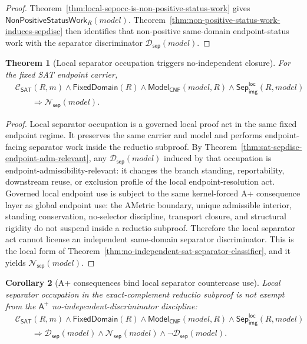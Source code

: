 \documentclass[11pt]{article}
\newtheorem{theorem}{Theorem}[section]
\newtheorem{corollary}[theorem]{Corollary}
\theoremstyle{definition}
\theoremstyle{remark}
\newcommand{\LocalSepImgOcc}{\mathsf{Sep}_{\mathsf{img}}^{\mathsf{loc}}}
\newcommand{\Aplus}{\mathsf{A}^{+}}
\newcommand{\ClayCtx}{\mathcal{C}_{\mathsf{SAT}}(R,m)}
\newcommand{\FixedDom}{\mathsf{FixedDomain}}
\newcommand{\SepDisc}{\mathcal{D}_{\mathsf{sep}}}
\newcommand{\NoSepDisc}{\mathcal{N}_{\mathsf{sep}}}
\newcommand{\ModelOfCnf}{\mathsf{Model}_{\mathsf{CNF}}}
\newcommand{\NonPositiveStatusWork}{\mathsf{NonPositiveStatusWork}}
\begin{document}
\begin{proof}
Theorem~\ref{thm:local-sepocc-is-non-positive-status-work} gives \(\NonPositiveStatusWork_R(model)\). Theorem~\ref{thm:non-positive-status-work-induces-sepdisc} then identifies that non-positive same-domain endpoint-status work with the separator discriminator \(\SepDisc(model)\).
\end{proof}

\begin{theorem}[Local separator occupation triggers no-independent closure]
\label{thm:local-sepocc-triggers-noindependent}
For the fixed SAT endpoint carrier,
\[
\begin{aligned}
  &\ClayCtx\wedge\FixedDom(R)\wedge\ModelOfCnf(model,R)\wedge\LocalSepImgOcc(R,model)\\
  &\qquad\Rightarrow \NoSepDisc(model).
\end{aligned}
\]
\end{theorem}

\begin{proof}
Local separator occupation is a governed local proof act in the same fixed endpoint regime. It preserves the same carrier and model and performs endpoint-facing separator work inside the reductio subproof. By Theorem~\ref{thm:sat-sepdisc-endpoint-adm-relevant}, any \(\SepDisc(model)\) induced by that occupation is endpoint-admissibility-relevant: it changes the branch standing, reportability, downstream reuse, or exclusion profile of the local endpoint-resolution act. Governed local endpoint use is subject to the same kernel-forced A+ consequence layer as global endpoint use: the AMetric boundary, unique admissible interior, standing conservation, no-selector discipline, transport closure, and structural rigidity do not suspend inside a reductio subproof. Therefore the local separator act cannot license an independent same-domain separator discriminator. This is the local form of Theorem~\ref{thm:no-independent-sat-separator-classifier}, and it yields \(\NoSepDisc(model)\).
\end{proof}


\begin{corollary}[A+ consequences bind local separator countercase use]
\label{cor:aplus-binds-local-separator-countercase-use}
Local separator occupation in the exact-complement reductio subproof is not exempt from the \(\Aplus\) no-independent-discriminator discipline:
\[
\begin{aligned}
  &\ClayCtx\wedge\FixedDom(R)\wedge\ModelOfCnf(model,R)\wedge\LocalSepImgOcc(R,model)\\
  &\qquad\Rightarrow \SepDisc(model)\wedge\NoSepDisc(model)\wedge\neg\SepDisc(model).
\end{aligned}
\]
\end{corollary}
\end{document}
